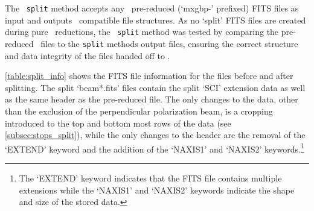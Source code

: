 The \stops\ \texttt{split} method accepts any \polsalt\ pre-reduced (`mxgbp-' prefixed) \gls{FITS} files as input and outputs \iraf\ compatible file structures. As no `split' \gls{FITS} files are created during pure \polsalt\ reductions, the \stops\ \texttt{split} method was tested by comparing the pre-reduced \polsalt\ files to the \texttt{split} methods output files, ensuring the correct structure and data integrity of the files handed off to \iraf.



\autoref{table:split_info} shows the \gls{FITS} file information for the files before and after splitting. The split `beam*.fits' files contain the split `SCI' extension data as well as the same header as the pre-reduced file. The only changes to the data, other than the exclusion of the perpendicular polarization beam, is a cropping introduced to the top and bottom most rows of the data (see \autoref{subsec:stops_split}), while the only changes to the header are the removal of the `EXTEND' keyword and the addition of the `NAXIS1' and `NAXIS2' keywords.\footnote{The `EXTEND' keyword indicates that the \gls{FITS} file contains multiple extensions while the `NAXIS1' and `NAXIS2' keywords indicate the shape and size of the stored data.}



